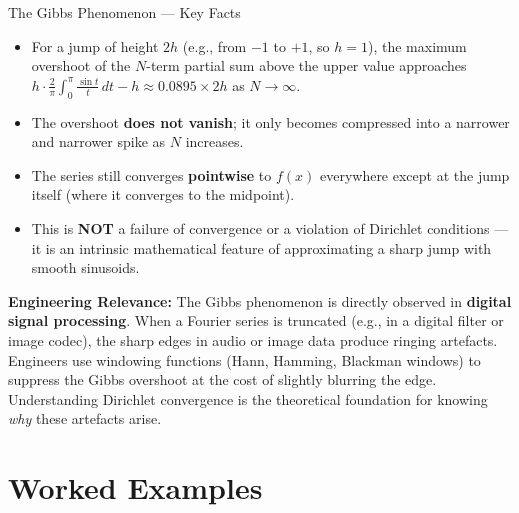 \documentclass[12pt,a4paper]{article}
\begin{document}
\medskip
\begin{infobox}{The Gibbs Phenomenon --- Key Facts}
\begin{itemize}[noitemsep]
   \item For a jump of height $2h$ (e.g., from $-1$ to $+1$, so $h=1$), the maximum overshoot of the $N$-term partial sum above the upper value approaches $h \cdot \frac{2}{\pi}\int_0^{\pi}\frac{\sin t}{t}\,dt - h \approx 0.0895 \times 2h$ as $N \to \infty$.
   \item The overshoot \textbf{does not vanish}; it only becomes compressed into a narrower and narrower spike as $N$ increases.
   \item The series still converges \textbf{pointwise} to $f(x)$ everywhere except at the jump itself (where it converges to the midpoint).
   \item This is \textbf{NOT} a failure of convergence or a violation of Dirichlet conditions --- it is an intrinsic mathematical feature of approximating a sharp jump with smooth sinusoids.
\end{itemize}
\end{infobox}

\medskip
\textbf{Engineering Relevance:}
The Gibbs phenomenon is directly observed in \textbf{digital signal processing}. When a Fourier series is truncated (e.g., in a digital filter or image codec), the sharp edges in audio or image data produce ringing artefacts. Engineers use windowing functions (Hann, Hamming, Blackman windows) to suppress the Gibbs overshoot at the cost of slightly blurring the edge. Understanding Dirichlet convergence is the theoretical foundation for knowing \emph{why} these artefacts arise.

\section{Worked Examples}
\end{document}
